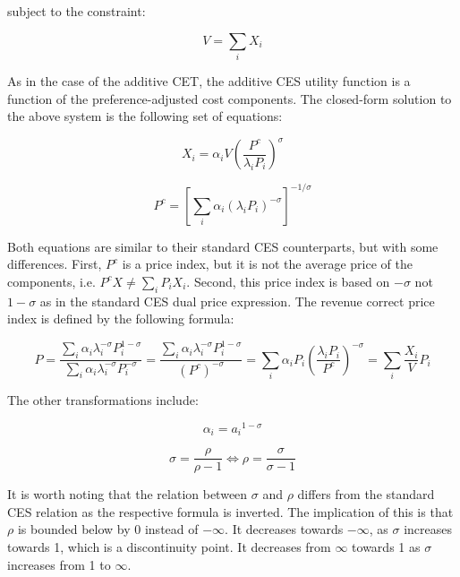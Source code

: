 \noindent subject to the constraint:

\begin{displaymath}
V=\sum\limits_{i} {X_i}
\end{displaymath}

\noindent As in the case of the additive CET, the additive CES utility function is a function
of the preference-adjusted cost components. The closed-form solution to the above system is the following set of equations:

\begin{equation}
\label{eq:CESAllocX}
X_i = \alpha_i V {\left( \frac {P^c} {\lambda_i P_i} \right)}^\sigma
\end{equation}

\begin{equation}
\label{eq:CESAllocP}
P^c={\left[ \sum\limits_i {\alpha_i \left( \lambda_i P_i \right)^{-\sigma}} \right]}^{-1/\sigma}
\end{equation}

\noindent Both equations are similar to their standard CES counterparts, but with some differences.
First, $P^c$ is a price index, but it is not the
average price of the components, i.e. $P^c X \ne \sum_i{P_i X_i}$. Second, this price index
is based on $-\sigma$ not $1 - \sigma$ as in the standard CES dual price expression. The revenue
correct price index is defined by the following formula:

\begin{equation}
\label{eq:CESAllocPa}
P=\frac{ \sum\limits_i {\alpha_i  \lambda_i^{-\sigma} P_i^{1-\sigma} } }
{ \sum\limits_i {\alpha_i  \lambda_i^{-\sigma} P_i^{-\sigma} } }
 = \frac{ \sum\limits_i {\alpha_i  \lambda_i^{-\sigma} P_i^{1-\sigma} } }
 {\left({P^c}\right)^{-\sigma}} = \sum\limits_i {\alpha_i P_i \left( \frac{\lambda_i P_i}{P^c} \right)^{-\sigma}}
 = \sum\limits_i {\frac{X_i}{V} P_i }
\end{equation}

\noindent The other transformations
include:

\begin{displaymath}
\alpha_i={a_i}^{1-\sigma}
\end{displaymath}

\begin{displaymath}
\sigma=\frac{\rho}{\rho-1} \iff \rho = \frac{\sigma}{\sigma-1}
\end{displaymath}

\noindent It is worth noting that the relation between $\sigma$ and $\rho$ differs from the standard CES
relation as the respective formula is inverted. The implication of this is that $\rho$ is bounded below
by 0 instead of $-\infty$. It decreases towards $-\infty$, as $\sigma$ increases towards 1, which
is a discontinuity point. It decreases from $\infty$ towards 1 as $\sigma$ increases from 1 to $\infty$.

